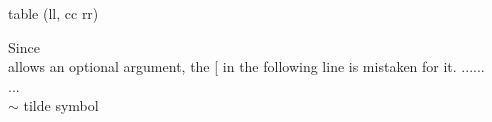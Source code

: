 table (ll, cc rr)
\usepackage{longtable}
Since \\ allows an optional argument, the [ in the following line is mistaken for it.
......         \\\relax
[whatever] ... \\
\(\sim \) tilde symbol